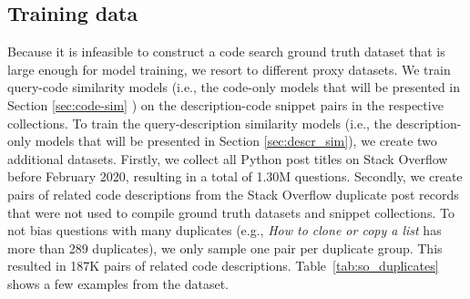 \documentclass[12pt,conference, onecolumn]{IEEEtran}
\begin{document}
\subsection{Training data}\label{sec:training_data}
Because it is infeasible to construct a code search ground truth dataset that is large enough for model training, we resort to different proxy datasets. We train query-code similarity models (i.e., the code-only models that will be presented in Section \ref{sec:code-sim} ) on the description-code snippet pairs in the respective collections. To train the query-description similarity models (i.e., the description-only models that will be presented in Section \ref{sec:descr_sim}), we create two additional datasets. Firstly, we collect all Python post titles on Stack Overflow before February 2020, resulting in a total of 1.30M questions. Secondly, we create pairs of related code descriptions from the Stack Overflow duplicate post records that were not used to compile ground truth datasets and snippet collections. To not bias questions with many duplicates (e.g., \emph{How to clone or copy a list} has more than 289 duplicates), we only sample one pair per duplicate group. This resulted in 187K pairs of related code descriptions. Table~\ref{tab:so_duplicates} shows a few examples from the dataset.
\end{document}

